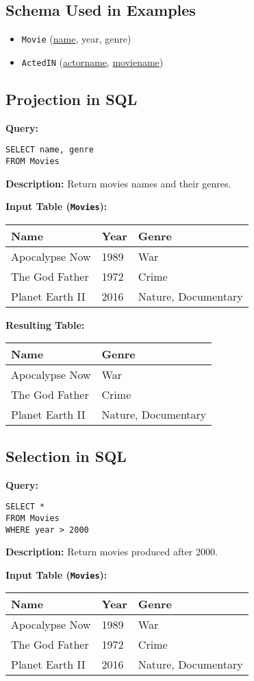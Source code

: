 \documentclass{article}
\begin{document}
\subsection*{Schema Used in Examples}
\begin{itemize}
    \item \texttt{Movie} (\underline{name}, year, genre) 
    \item \texttt{ActedIN} (\underline{actorname}, \underline{moviename}) 
\end{itemize}

\subsection*{Projection in SQL}
\textbf{Query:}
\begin{lstlisting}
SELECT name, genre
FROM Movies
\end{lstlisting}
\textbf{Description:} Return movies names and their genres.

\textbf{Input Table (\texttt{Movies}):}
\begin{tabular}{|l|l|l|}
    \hline
    \textbf{Name} & \textbf{Year} & \textbf{Genre} \\
    \hline
    Apocalypse Now & 1989 & War \\
    The God Father & 1972 & Crime \\
    Planet Earth II & 2016 & Nature, Documentary \\
    \hline
\end{tabular}
\textbf{Resulting Table:}
\begin{tabular}{|l|l|}
    \hline
    \textbf{Name} & \textbf{Genre} \\
    \hline
    Apocalypse Now & War \\
    The God Father & Crime \\
    Planet Earth II & Nature, Documentary \\
    \hline
\end{tabular}


\subsection*{Selection in SQL}
\textbf{Query:}
\begin{lstlisting}
SELECT *
FROM Movies
WHERE year > 2000
\end{lstlisting}
\textbf{Description:} Return movies produced after 2000.

\textbf{Input Table (\texttt{Movies}):}
\begin{tabular}{|l|l|l|}
    \hline
    \textbf{Name} & \textbf{Year} & \textbf{Genre} \\
    \hline
    Apocalypse Now & 1989 & War \\
    The God Father & 1972 & Crime \\
    Planet Earth II & 2016 & Nature, Documentary \\
    \hline
\end{tabular}
\end{document}
